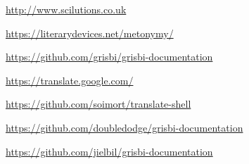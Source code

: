 

\urldef{\urlBob}%
\url{http://www.scilutions.co.uk}

\urldef{\urlMetonym}%
\url{https://literarydevices.net/metonymy/}

\urldef{\urlGitDoc}%
\url{https://github.com/grisbi/grisbi-documentation}

\urldef{\urlGtrans}%
\url{https://translate.google.com/}

\urldef{\urlGtransShell}%
\url{https://github.com/soimort/translate-shell}

\urldef{\urlBobDoc}%
\url{https://github.com/doubledodge/grisbi-documentation}

\urldef{\urlJeanLucGit}%
\url{https://github.com/jielbil/grisbi-documentation}




